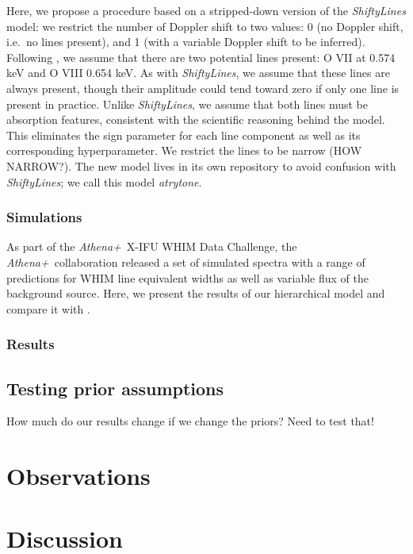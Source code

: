 \documentclass[12pt]{emulateapj}
\newcommand{\project}[1]{\textsl{#1}}
\newcommand{\athena}{\project{Athena+}}
\begin{document}
Here, we propose a procedure based on a stripped-down version of the \textit{ShiftyLines} model: we restrict the number of Doppler shift to two values: 0 (no Doppler shift, i.e.\ no lines present), and 1 (with a variable Doppler shift to be inferred). Following \citep{brand2016}, we assume that there are two potential lines present: O VII at 0.574 keV and O VIII 0.654 keV. As with \textit{ShiftyLines}, we assume that these lines are always present, though their amplitude could tend toward zero if only one line is present in practice. Unlike \textit{ShiftyLines}, we assume that both lines must be absorption features, consistent with the scientific reasoning behind the model. This eliminates the sign parameter for each line component as well as its corresponding hyperparameter. We restrict the lines to be narrow (HOW NARROW?). The new model lives in its own repository to avoid confusion with \textit{ShiftyLines}; we call this model \textit{atrytone}. 

\subsubsection{Simulations}

As part of the \athena\ X-IFU WHIM Data Challenge, the \athena\ collaboration released a set of simulated spectra with a range of predictions for WHIM line equivalent widths as well as variable flux of the background source. Here, we present the results of our hierarchical model and compare it with \citep{brand2016}.

\subsubsection{Results}



\subsection{Testing prior assumptions}

How much do our results change if we change the priors? Need to test that!

\section{Observations}


\section{Discussion}
\end{document}
